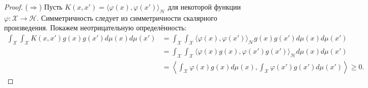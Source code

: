 \begin{proof}
    ($\Rightarrow$) Пусть $K(x, x') = \langle \varphi(x), \varphi(x') \rangle_\mathcal{H}$ для некоторой функции $\varphi \colon \mathcal{X} \to \mathcal{H}$. Симметричность следует из симметричности скалярного произведения. Покажем неотрицательную определённость:
    \begin{align*}
        \int_\mathcal{X} \int_\mathcal{X} K(x, x') g(x) g(x') d\mu(x) d\mu(x') & = \int_\mathcal{X} \int_\mathcal{X} \langle \varphi(x), \varphi(x') \rangle_\mathcal{H} g(x) g(x') d\mu(x) d\mu(x')       \\
                                                                               & = \int_\mathcal{X} \int_\mathcal{X} \langle \varphi(x) g(x), \varphi(x') g(x') \rangle_\mathcal{H} d\mu(x) d\mu(x')       \\
                                                                               & = \left\langle \int_\mathcal{X} \varphi(x) g(x) d\mu(x), \int_\mathcal{X} \varphi(x') g(x') d\mu(x') \right\rangle \ge 0.
    \end{align*}


\end{proof}
